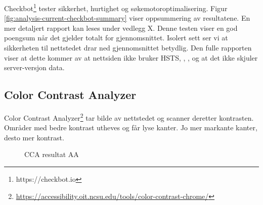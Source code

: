 Checkbot\footnote{https://checkbot.io} tester sikkerhet, hurtighet og søkemotoroptimalisering. Figur \ref{fig:analysis-current-checkbot-summary} viser oppsummering av resultatene. En mer detaljert rapport kan leses under vedlegg X. Denne testen viser en god poengsum når det gjelder totalt for gjennomsnittet. Isolert sett ser vi at sikkerheten til nettstedet drar ned gjennomsnittet betydlig. Den fulle rapporten viser at dette kommer av at nettsiden ikke bruker HSTS, , ,  og at det ikke skjuler server-versjon data.

\subsection{Color Contrast Analyzer}
\label{sec:analysis-current-color-contrast-analyzer}
Color Contrast Analyzer\footnote{\url{https://accessibility.oit.ncsu.edu/tools/color-contrast-chrome/}} tar bilde av nettstedet og scanner deretter kontrasten. Områder med bedre kontrast utheves og får lyse kanter. Jo mer markante kanter, desto mer kontrast.

\begin{figure}[H]
    \centering
    \caption{CCA resultat AA}
    \label{fig:analysis-current-cca-aa}
\end{figure}

